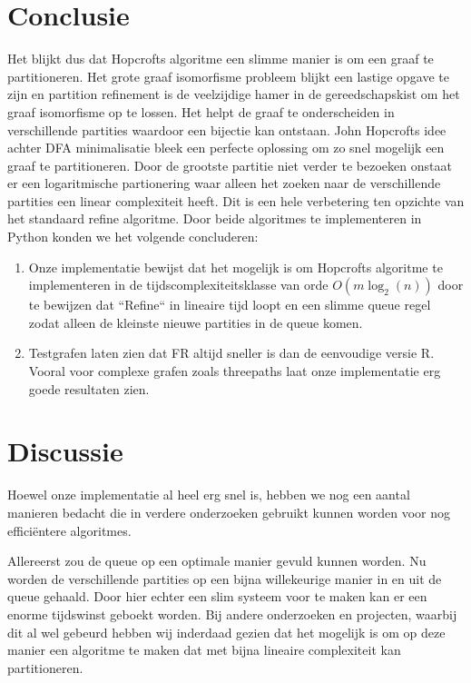\documentclass[twoside]{article}
\begin{document}
\begin{multicols}{2}
\section{Conclusie}
Het blijkt dus dat Hopcrofts algoritme een slimme manier is om een graaf te partitioneren. Het grote graaf isomorfisme probleem blijkt een lastige opgave te zijn en partition refinement is de veelzijdige hamer in de gereedschapskist om het graaf isomorfisme op te lossen. Het helpt de graaf te onderscheiden in verschillende partities waardoor een bijectie kan ontstaan. John Hopcrofts idee achter DFA minimalisatie bleek een perfecte oplossing om zo snel mogelijk een graaf te partitioneren. Door de grootste partitie niet verder te bezoeken onstaat er een logaritmische partionering waar alleen het zoeken naar de verschillende partities een linear complexiteit heeft. Dit is een hele verbetering ten opzichte van het standaard refine algoritme. Door beide algoritmes te implementeren in Python konden we het volgende concluderen:

\begin{enumerate}
\item Onze implementatie bewijst dat het mogelijk is om Hopcrofts algoritme te implementeren in de tijdscomplexiteitsklasse van orde $O(m\log_{2}(n))$ door te bewijzen dat ``Refine`` in lineaire tijd loopt en een slimme queue regel zodat alleen de kleinste nieuwe partities in de queue komen.
\item Testgrafen laten zien dat FR altijd sneller is dan de eenvoudige versie R. Vooral voor complexe grafen zoals threepaths laat onze implementatie erg goede resultaten zien.
\end{enumerate}

\section{Discussie}
Hoewel onze implementatie al heel erg snel is, hebben we nog een aantal manieren bedacht die in verdere onderzoeken gebruikt kunnen worden voor nog effici\"entere algoritmes.

Allereerst zou de queue op een optimale manier gevuld kunnen worden. Nu worden de verschillende partities op een bijna willekeurige manier in en uit de queue gehaald. Door hier echter een slim systeem voor te maken kan er een enorme tijdswinst geboekt worden. Bij andere onderzoeken en projecten, waarbij dit al wel gebeurd hebben wij inderdaad gezien dat het mogelijk is om op deze manier een algoritme te maken dat met bijna lineaire complexiteit kan partitioneren.


\end{multicols}
\end{document}

